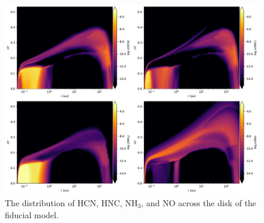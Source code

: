 \documentclass[twoside, single, authoryear, semicolon]{lion-msc}
\newcommand{\3}{$_3$}
\newcommand{\2}{$_2$}
\begin{document}
\begin{figure}[!ht]
    \centering
    \includegraphics[width=\linewidth]{Figures/Abundance.pdf}
    \caption{The distribution of HCN, HNC, NH\3, and NO across the disk of the fiducial model.}
    \label{fig:nitrogen distribution}
\end{figure}
\end{document}
